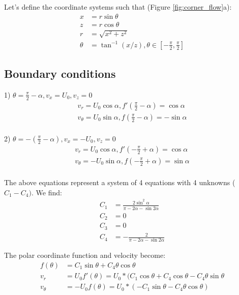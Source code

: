 \documentclass[a4paper,11pt]{article}
\begin{document}
Let's define the coordinate systems such that (Figure \ref{fig:corner_flow}a):
\begin{align}
x &= r\sin\theta \\
z &= r\cos\theta \\
r &= \sqrt{x^2+z^2}\\
\theta &= \tan^{-1}({x/z}), \theta\in\left[-\frac{\pi}{2},\frac{\pi}{2}\right]
\end{align}

\subsection{Boundary conditions}

1) $\theta = \frac{\pi}{2}-\alpha, v_x = U_0, v_z = 0$
\begin{align}
v_r= U_0\cos\alpha, f'(\frac{\pi}{2}-\alpha) = \cos\alpha\\
v_\theta=U_0\sin\alpha, f(\frac{\pi}{2}-\alpha) = -\sin\alpha\\
\end{align}

2) $\theta = -(\frac{\pi}{2}-\alpha), v_x = -U_0, v_z = 0$
\begin{align}
v_r= U_0\cos\alpha, f'(-\frac{\pi}{2}+\alpha) = \cos\alpha\\
v_\theta=-U_0\sin\alpha, f(-\frac{\pi}{2}+\alpha) = \sin\alpha\\
\end{align}

The above equations represent a system of 4 equations with 4 unknowns ($C_1-C_4)$. We find:
\begin{align}
C_1 &= \frac{\displaystyle 2\sin^2\alpha}{\displaystyle \pi-2\alpha-\sin2\alpha} \\
C_2 &= 0\\
C_3 &= 0\\
C_4 &= -\frac{\displaystyle 2}{\displaystyle \pi-2\alpha-\sin2\alpha} 
\end{align}

The polar coordinate function and velocity become:
\begin{align}
f(\theta) &= C_1\sin\theta+C_4\theta\cos\theta \\
v_r&= U_0 f'(\theta) = U_0*(C_1\cos\theta+C_4\cos\theta-C_4\theta\sin\theta\\
v_\theta&=-U_0 f(\theta) = U_0*(-C_1\sin\theta-C_4\theta\cos\theta)
\end{align}
\end{document}
